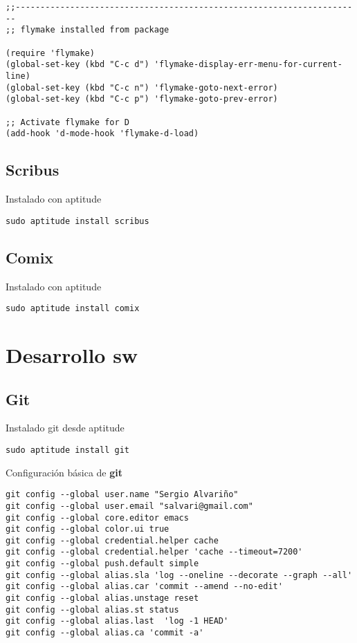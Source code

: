 \documentclass[12pt,spanish,]{article}
\begin{document}
\begin{verbatim}
;;----------------------------------------------------------------------
;; flymake installed from package

(require 'flymake)
(global-set-key (kbd "C-c d") 'flymake-display-err-menu-for-current-line)
(global-set-key (kbd "C-c n") 'flymake-goto-next-error)
(global-set-key (kbd "C-c p") 'flymake-goto-prev-error)

;; Activate flymake for D
(add-hook 'd-mode-hook 'flymake-d-load)
\end{verbatim}

\subsection{Scribus}\label{scribus}

Instalado con aptitude

\begin{verbatim}
sudo aptitude install scribus
\end{verbatim}

\subsection{Comix}\label{comix}

Instalado con aptitude

\begin{verbatim}
sudo aptitude install comix
\end{verbatim}

\section{Desarrollo sw}\label{desarrollo-sw}

\subsection{Git}\label{git}

Instalado git desde aptitude

\begin{verbatim}
sudo aptitude install git
\end{verbatim}

Configuración básica de \textbf{git}

\begin{verbatim}
git config --global user.name "Sergio Alvariño"
git config --global user.email "salvari@gmail.com"
git config --global core.editor emacs
git config --global color.ui true
git config --global credential.helper cache
git config --global credential.helper 'cache --timeout=7200'
git config --global push.default simple
git config --global alias.sla 'log --oneline --decorate --graph --all'
git config --global alias.car 'commit --amend --no-edit'
git config --global alias.unstage reset
git config --global alias.st status
git config --global alias.last  'log -1 HEAD'
git config --global alias.ca 'commit -a'
\end{verbatim}
\end{document}
